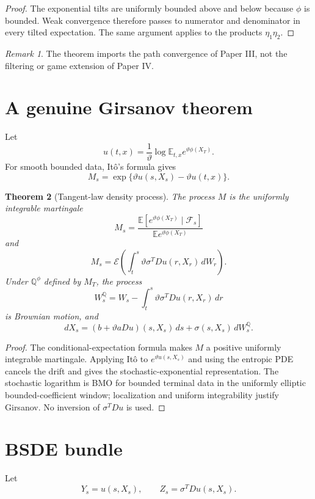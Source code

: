 \documentclass[11pt,reqno]{amsart}
\newtheorem{theorem}{Theorem}[section]
\theoremstyle{definition}
\theoremstyle{remark}
\newtheorem{remark}[theorem]{Remark}
\newcommand{\E}{\mathbb E}
\newcommand{\F}{\mathcal F}
\newcommand{\Qp}{\mathbb Q}
\begin{document}
\begin{proof}
The exponential tilts are uniformly bounded above and below because $\phi$ is
bounded.  Weak convergence therefore passes to numerator and denominator in
every tilted expectation.  The same argument applies to the products
$\eta_1\eta_2$.
\end{proof}

\begin{remark}
The theorem imports the path convergence of Paper III, not the filtering or
game extension of Paper IV.
\end{remark}

\section{A genuine Girsanov theorem}\label{sec:girsanov}

Let
\[
 u(t,x)
 =
 \frac1\vartheta
 \log\E_{t,x}e^{\vartheta\phi(X_T)}.
\]
For smooth bounded data, It\^o's formula gives
\[
 M_s
 =
 \exp\{\vartheta u(s,X_s)-\vartheta u(t,x)\}.
\]

\begin{theorem}[Tangent-law density process]\label{thm:girsanov}
The process $M$ is the uniformly integrable martingale
\[
 M_s
 =
 \frac{\E[e^{\vartheta\phi(X_T)}\mid\F_s]}
 {\E e^{\vartheta\phi(X_T)}}
\]
and
\[
 M_s
 =
 \mathcal E\left(
 \int_t^s\vartheta\sigma^TDu(r,X_r)\,dW_r
 \right).
\]
Under $\Qp^\phi$ defined by $M_T$, the process
\[
 W_s^{\Qp}
 =
 W_s-\int_t^s\vartheta\sigma^TDu(r,X_r)\,dr
\]
is Brownian motion, and
\[
 dX_s
 =
 \left(b+\vartheta aDu\right)(s,X_s)\,ds
 +\sigma(s,X_s)\,dW_s^{\Qp}.
\]
\end{theorem}

\begin{proof}
The conditional-expectation formula makes $M$ a positive uniformly integrable
martingale.  Applying It\^o to $e^{\vartheta u(s,X_s)}$ and using the entropic
PDE cancels the drift and gives the stochastic-exponential representation.
The stochastic logarithm is BMO for bounded terminal data in the uniformly
elliptic bounded-coefficient window; localization and uniform integrability
justify Girsanov.  No inversion of $\sigma^TDu$ is used.
\end{proof}

\section{BSDE bundle}\label{sec:bsde}

Let
\[
 Y_s=u(s,X_s),\qquad Z_s=\sigma^TDu(s,X_s).
\]
\end{document}
